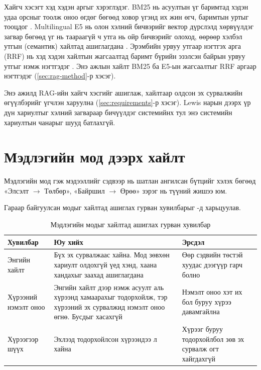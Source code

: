 Хайгч хэсэгт хэд хэдэн аргыг хэрэглэдэг. BM25 нь асуултын үг баримтад хэдэн удаа орсныг тоолж оноо өгдөг бөгөөд ховор үгэнд их жин өгч, баримтын уртыг тооцдог \cite{robertson2009bm25}. Multilingual E5 нь олон хэлний бичвэрийг вектор дүрслэлд хөрвүүлдэг загвар бөгөөд үг нь таараагүй ч утга нь ойр бичвэрийг олоход, өөрөөр хэлбэл утгын (семантик) хайлтад ашиглагдана \cite{wang2024me5}. Эрэмбийн урвуу утгаар нэгтгэх арга (\acs{RRF}) нь хэд хэдэн хайлтын жагсаалтад баримт бүрийн эзэлсэн байрын урвуу утгыг нэмж нэгтгэдэг \cite{cormack2009rrf}. Энэ ажлын хайлт BM25 ба E5-ын жагсаалтыг RRF аргаар нэгтгэдэг (\ref{sec:rag-method}-р хэсэг).

Энэ ажилд \acs{RAG}-ийн хайгч хэсгийг ашиглаж, хайлтаар олдсон эх сурвалжийн өгүүлбэрийг үгчлэн харуулна (\ref{sec:requirements}-р хэсэг). Lewis нарын дээрх үр дүн хариултыг хэлний загвараар бичүүлдэг системийнх тул энэ системийн хариултын чанарыг шууд батлахгүй.


\section{Мэдлэгийн мод дээрх хайлт}
\label{sec:lit-tree}

Мэдлэгийн мод гэж мэдээллийг сэдвээр нь шатлан ангилсан бүтцийг хэлэх бөгөөд «Элсэлт $\rightarrow$ Төлбөр», «Байршил $\rightarrow$ Өрөө» зэрэг нь түүний жишээ юм.


Гараар байгуулсан модыг хайлтад ашиглах гурван хувилбарыг -д харьцуулав.

\begin{table}[htbp]
\centering
\caption{Мэдлэгийн модыг хайлтад ашиглах гурван хувилбар}
\label{tab:tree_options}
\begin{tabular}{|p{2.6cm}|p{5.7cm}|p{5.3cm}|}
\hline
\textbf{Хувилбар} & \textbf{Юу хийх} & \textbf{Эрсдэл} \\
\hline
Энгийн хайлт & Бүх эх сурвалжаас хайна. Мод зөвхөн хариулт олдохгүй үед хэнд, хаана хандахыг заахад ашиглагдана & Өөр сэдвийн төстэй хуудас дээгүүр гарч болно \\
\hline
Хүрээний нэмэлт оноо & Энгийн хайлт дээр нэмж асуулт аль хүрээнд хамаарахыг тодорхойлж, тэр хүрээний эх сурвалжид нэмэлт оноо өгнө. Бусдыг хасахгүй & Нэмэлт оноо хэт их бол буруу хүрээ давамгайлна \\
\hline
Хүрээгээр шүүх & Эхлээд тодорхойлсон хүрээндээ л хайна & Хүрээг буруу тодорхойлбол зөв эх сурвалж огт хайгдахгүй \\
\hline
\end{tabular}
\end{table}

